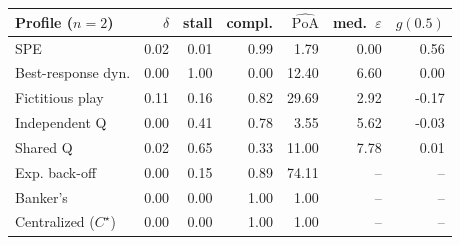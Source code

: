 \begin{tabular}{lrrrrrr}
\toprule
Profile ($n=2$) & $\delta$ & stall & compl. & $\widehat{\mathrm{PoA}}$ & med.\ $\varepsilon$ & $g(0.5)$ \\
\midrule
SPE & 0.02 & 0.01 & 0.99 & 1.79 & 0.00 & 0.56 \\
Best-response dyn. & 0.00 & 1.00 & 0.00 & 12.40 & 6.60 & 0.00 \\
Fictitious play & 0.11 & 0.16 & 0.82 & 29.69 & 2.92 & -0.17 \\
Independent Q & 0.00 & 0.41 & 0.78 & 3.55 & 5.62 & -0.03 \\
Shared Q & 0.02 & 0.65 & 0.33 & 11.00 & 7.78 & 0.01 \\
Exp. back-off & 0.00 & 0.15 & 0.89 & 74.11 & -- & -- \\
Banker's & 0.00 & 0.00 & 1.00 & 1.00 & -- & -- \\
Centralized ($C^\star$) & 0.00 & 0.00 & 1.00 & 1.00 & -- & -- \\
\bottomrule
\end{tabular}
